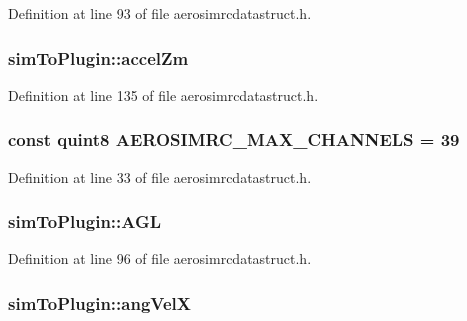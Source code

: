 Definition at line 93 of file aerosimrcdatastruct.\-h.

\hypertarget{group___aero_sim_r_c_ga15b5242cd24b1253d8fa5a12d07e3b76}{
\subsubsection[{accel\-Zm}]{ sim\-To\-Plugin\-::accel\-Zm}}\label{group___aero_sim_r_c_ga15b5242cd24b1253d8fa5a12d07e3b76}


Definition at line 135 of file aerosimrcdatastruct.\-h.

\hypertarget{group___aero_sim_r_c_ga63f989ac10cdcbfefadc5e65055d3c7d}{
\subsubsection[{A\-E\-R\-O\-S\-I\-M\-R\-C\-\_\-\-M\-A\-X\-\_\-\-C\-H\-A\-N\-N\-E\-L\-S}]{\setlength{\rightskip}{0pt plus 5cm}const quint8 A\-E\-R\-O\-S\-I\-M\-R\-C\-\_\-\-M\-A\-X\-\_\-\-C\-H\-A\-N\-N\-E\-L\-S = 39}}\label{group___aero_sim_r_c_ga63f989ac10cdcbfefadc5e65055d3c7d}


Definition at line 33 of file aerosimrcdatastruct.\-h.

\hypertarget{group___aero_sim_r_c_gadaa747e1f33381fce539ba3df9915281}{
\subsubsection[{A\-G\-L}]{ sim\-To\-Plugin\-::\-A\-G\-L}}\label{group___aero_sim_r_c_gadaa747e1f33381fce539ba3df9915281}


Definition at line 96 of file aerosimrcdatastruct.\-h.

\hypertarget{group___aero_sim_r_c_ga3332a8f491a5197d28d85241d32d6f81}{
\subsubsection[{ang\-Vel\-X}]{ sim\-To\-Plugin\-::ang\-Vel\-X}}\label{group___aero_sim_r_c_ga3332a8f491a5197d28d85241d32d6f81}


